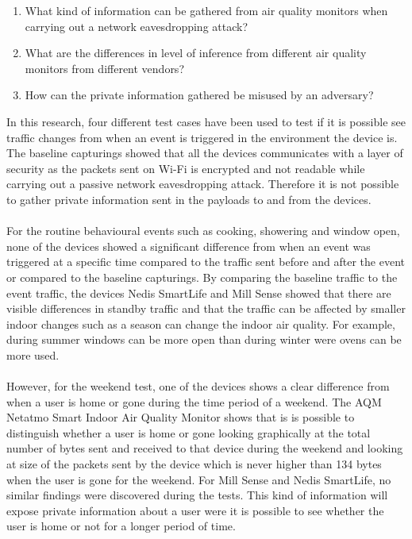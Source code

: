 \begin{enumerate}
    \item What kind of information can be gathered from air quality monitors when carrying out a network eavesdropping attack?
    \item What are the differences in level of inference from different air quality monitors from different vendors?
    \item How can the private information gathered be misused by an adversary?
\end{enumerate}

In this research, four different test cases have been used to test if it is possible see traffic changes from when an event is triggered in the environment the device is. The baseline capturings showed that all the devices communicates with a layer of security as the packets sent on Wi-Fi is encrypted and not readable while carrying out a passive network eavesdropping attack. Therefore it is not possible to gather private information sent in the payloads to and from the devices. 
\\\\
For the routine behavioural events such as cooking, showering and window open, none of the devices showed a significant difference from when an event was triggered at a specific time compared to the traffic sent before and after the event or compared to the baseline capturings. By comparing the baseline traffic to the event traffic, the devices Nedis SmartLife and Mill Sense showed that there are visible differences in standby traffic and that the traffic can be affected by smaller indoor changes such as a season can change the indoor air quality. For example, during summer windows can be more open than during winter were ovens can be more used. 
\\\\
However, for the weekend test, one of the devices shows a clear difference from when a user is home or gone during the time period of a weekend. The AQM Netatmo Smart Indoor Air Quality Monitor shows that is is possible to distinguish whether a user is home or gone looking graphically at the total number of bytes sent and received to that device during the weekend and looking at size of the packets sent by the device which is never higher than 134 bytes when the user is gone for the weekend. For Mill Sense and Nedis SmartLife, no similar findings were discovered during the tests. This kind of information will expose private information about a user were it is possible to see whether the user is home or not for a longer period of time. 
